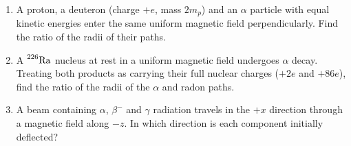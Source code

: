 \begin{enumerate}[itemsep=3pt]
      average energy carried away by antineutrinos per decay, and explain why this energy is lost to any
      absorber.
\item\label{prob:decay-rpa} A proton, a deuteron (charge $+e$, mass $2m_p$) and an $\alpha$ particle with
      equal kinetic energies enter the same uniform magnetic field perpendicularly. Find the ratio of the
      radii of their paths.
\item\label{prob:decay-rrn} A $\prescript{226}{}{\mathrm{Ra}}$ nucleus at rest in a uniform magnetic field undergoes $\alpha$
      decay. Treating both products as carrying their full nuclear charges ($+2e$ and $+86e$), find the ratio
      of the radii of the $\alpha$ and radon paths.
\item\label{prob:decay-dirs} A beam containing $\alpha$, $\beta^-$ and $\gamma$ radiation travels in the $+x$
      direction through a magnetic field along $-z$. In which direction is each component initially
      deflected?
\end{enumerate}
\endgroup


